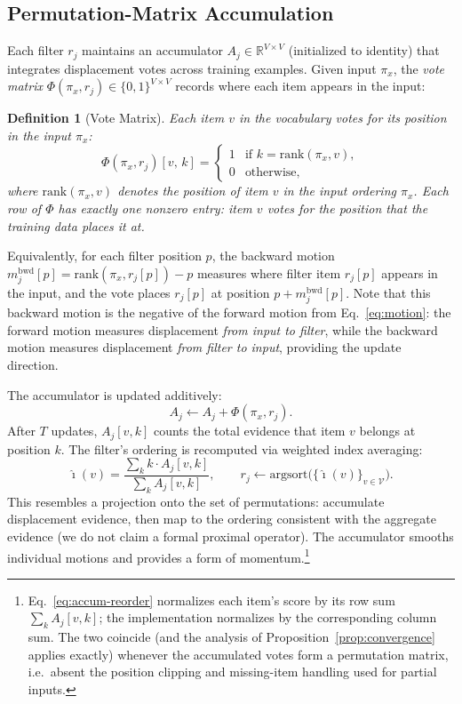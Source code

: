 \documentclass[12pt]{article}
\newcommand{\R}{\mathbb{R}}
\newcommand{\argsort}{\mathrm{argsort}}
\newcommand{\rankop}{\mathrm{rank}}
\newtheorem{definition}[theorem]{Definition}
\begin{document}
\subsection{Permutation-Matrix Accumulation}
\label{sec:perm-accum}

Each filter $r_j$ maintains an accumulator $A_j \in \R^{V \times V}$ (initialized to identity) that integrates displacement votes across training examples. Given input $\pi_x$, the \emph{vote matrix} $\Phi(\pi_x, r_j) \in \{0,1\}^{V \times V}$ records where each item appears in the input:
\begin{definition}[Vote Matrix]
\label{def:vote-matrix}
Each item $v$ in the vocabulary votes for its position in the input $\pi_x$:
\[
\Phi(\pi_x, r_j)[v,\, k] = \begin{cases} 1 & \text{if } k = \rankop(\pi_x, v), \\ 0 & \text{otherwise,} \end{cases}
\]
where $\rankop(\pi_x, v)$ denotes the position of item $v$ in the input ordering $\pi_x$.
Each row of $\Phi$ has exactly one nonzero entry: item $v$ votes for the position that the training data places it at.
\end{definition}

Equivalently, for each filter position $p$, the backward motion $m_j^{\mathrm{bwd}}[p] = \rankop(\pi_x, r_j[p]) - p$ measures where filter item $r_j[p]$ appears in the input, and the vote places $r_j[p]$ at position $p + m_j^{\mathrm{bwd}}[p]$. Note that this backward motion is the negative of the forward motion from Eq.~\eqref{eq:motion}: the forward motion measures displacement \emph{from input to filter}, while the backward motion measures displacement \emph{from filter to input}, providing the update direction.

The accumulator is updated additively:
\begin{equation}
\label{eq:accum-update}
A_j \leftarrow A_j + \Phi(\pi_x, r_j).
\end{equation}
After $T$ updates, $A_j[v, k]$ counts the total evidence that item $v$ belongs at position $k$. The filter's ordering is recomputed via weighted index averaging:
\begin{equation}
\label{eq:accum-reorder}
\hat{\imath}(v) = \frac{\sum_k k \cdot A_j[v, k]}{\sum_k A_j[v, k]}, \qquad
r_j \leftarrow \argsort\big(\{\hat{\imath}(v)\}_{v \in \mathcal{V}}\big).
\end{equation}
This resembles a projection onto the set of permutations: accumulate displacement evidence, then map to the ordering consistent with the aggregate evidence (we do not claim a formal proximal operator). The accumulator smooths individual motions and provides a form of momentum.\footnote{Eq.~\eqref{eq:accum-reorder} normalizes each item's score by its row sum $\sum_k A_j[v,k]$; the implementation normalizes by the corresponding column sum. The two coincide (and the analysis of Proposition~\ref{prop:convergence} applies exactly) whenever the accumulated votes form a permutation matrix, i.e.\ absent the position clipping and missing-item handling used for partial inputs.}
\end{document}
